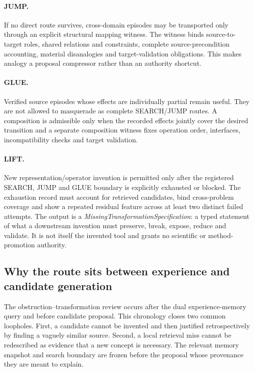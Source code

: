 \paragraph{JUMP.}
If no direct route survives, cross-domain episodes may be transported only through an explicit structural mapping witness. The witness binds source-to-target roles, shared relations and constraints, complete source-precondition accounting, material disanalogies and target-validation obligations. This makes analogy a proposal compressor rather than an authority shortcut.

\paragraph{GLUE.}
Verified source episodes whose effects are individually partial remain useful. They are not allowed to masquerade as complete SEARCH/JUMP routes. A composition is admissible only when the recorded effects jointly cover the desired transition and a separate composition witness fixes operation order, interfaces, incompatibility checks and target validation.

\paragraph{LIFT.}
New representation/operator invention is permitted only after the registered SEARCH, JUMP and GLUE boundary is explicitly exhausted or blocked. The exhaustion record must account for retrieved candidates, bind cross-problem coverage and show a repeated residual feature across at least two distinct failed attempts. The output is a \emph{MissingTransformationSpecification}: a typed statement of what a downstream invention must preserve, break, expose, reduce and validate. It is not itself the invented tool and grants no scientific or method-promotion authority.

\subsection{Why the route sits between experience and candidate generation}

The obstruction--transformation review occurs after the dual experience-memory query and before candidate proposal. This chronology closes two common loopholes. First, a candidate cannot be invented and then justified retrospectively by finding a vaguely similar source. Second, a local retrieval miss cannot be redescribed as evidence that a new concept is necessary. The relevant memory snapshot and search boundary are frozen before the proposal whose provenance they are meant to explain.

